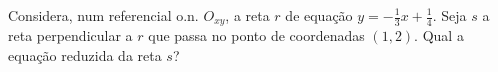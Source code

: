 Considera, num referencial o.n. $O_{xy}$, a reta $r$ de equação $y=-\frac 1 3 x + \frac 1 4$. Seja $s$ a reta perpendicular a $r$ que passa no ponto de coordenadas $(1,2)$. Qual a equação reduzida da reta $s$?

